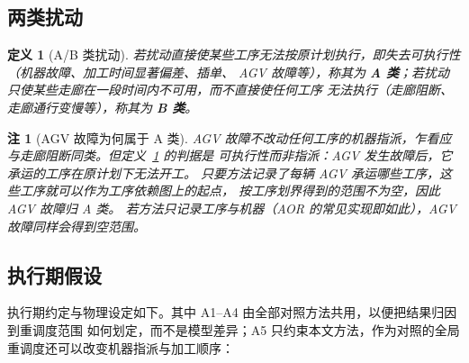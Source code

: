\documentclass[manuscript,screen,review]{acmart}
\newtheorem{definition}{定义}
\newtheorem{remark}{注}
\begin{document}
\subsection{两类扰动}
\label{sec:disturbance_classes}

\begin{definition}[A/B 类扰动]
\label{def:ab}
若扰动直接使某些工序无法按原计划执行，即失去\emph{可执行性}（机器故障、加工时间显著偏差、插单、
AGV 故障等），称其为 \textbf{A 类}；若扰动只使某些走廊在一段时间内不可用，而不直接使任何工序
无法执行（走廊阻断、走廊通行变慢等），称其为 \textbf{B 类}。
\end{definition}

\begin{remark}[AGV 故障为何属于 A 类]
\label{rem:agv_class}
AGV 故障不改动任何工序的机器指派，乍看应与走廊阻断同类。但定义~\ref{def:ab} 的判据是
\emph{可执行性}而非指派：AGV 发生故障后，它承运的工序在原计划下无法开工。
只要方法记录了每辆 AGV 承运哪些工序，这些工序就可以作为工序依赖图上的起点，
按工序划界得到的范围不为空，因此 AGV 故障归 A 类。
若方法只记录工序与机器（AOR 的常见实现即如此），AGV 故障同样会得到空范围。
\end{remark}

\subsection{执行期假设}
\label{sec:assumptions}

执行期约定与物理设定如下。其中 A1--A4 由全部对照方法共用，以便把结果归因到重调度范围
如何划定，而不是模型差异；A5 只约束本文方法，作为对照的全局重调度还可以改变机器指派与加工顺序：
\end{document}
